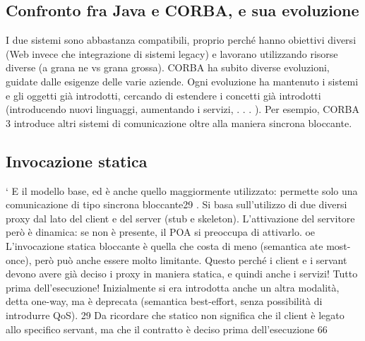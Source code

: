 \subsection{Confronto fra Java e CORBA, e sua evoluzione}
I due sistemi sono abbastanza compatibili, proprio perché hanno obiettivi diversi
(Web invece che integrazione di sistemi legacy) e lavorano utilizzando risorse
diverse (a grana ne vs grana grossa).
CORBA ha subito diverse evoluzioni, guidate dalle esigenze delle varie aziende.
Ogni evoluzione ha mantenuto i sistemi e gli oggetti già introdotti, cercando di
estendere i concetti già introdotti (introducendo nuovi linguaggi, aumentando i
servizi, . . . ). Per esempio, CORBA 3 introduce altri sistemi di comunicazione
oltre alla maniera sincrona bloccante.
\subsection{Invocazione statica}
`
E il modello base, ed è anche quello maggiormente utilizzato: permette solo una
comunicazione di tipo sincrona bloccante29 . Si basa sull'utilizzo di due diversi
proxy dal lato del client e del server (stub e skeleton). L'attivazione del servitore
però è dinamica: se non è presente, il POA si preoccupa di attivarlo.
oe
L'invocazione statica bloccante è quella che costa di meno (semantica ate
most-once), però può anche essere molto limitante. Questo perché i client e
i servant devono avere già deciso i proxy in maniera statica, e quindi anche i
servizi! Tutto prima dell'esecuzione!
Inizialmente si era introdotta anche un altra modalità, detta one-way, ma è
deprecata (semantica best-effort, senza possibilità di introdurre QoS).
29 Da ricordare che statico non significa che il client è legato allo specifico servant, ma che il
contratto è deciso prima dell'esecuzione
66
